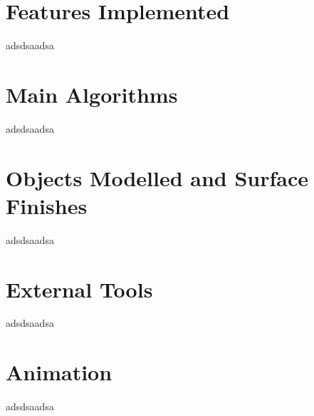 \documentclass[]{article}
\begin{document}
\section*{Features Implemented}
adsdsaadsa


\section*{Main Algorithms}
adsdsaadsa


\section*{Objects Modelled and Surface Finishes}
adsdsaadsa


\section*{External Tools}
adsdsaadsa


\section*{Animation}
adsdsaadsa


\break
\setlength{}
\printbibliography

\end{document}
